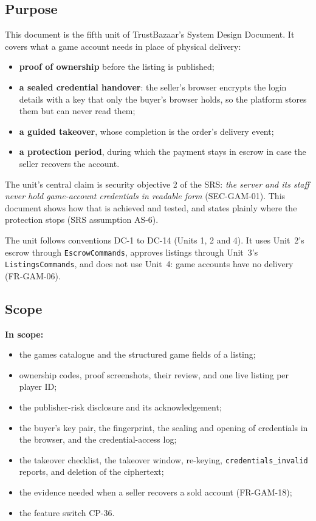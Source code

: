 \documentclass[11pt,a4paper]{article}
\begin{document}
\subsection{Purpose}
This document is the fifth unit of TrustBazaar's System Design Document. It covers what a game account needs in place of physical delivery:
\begin{itemize}[nosep]
  \item \textbf{proof of ownership} before the listing is published;
  \item \textbf{a sealed credential handover}: the seller's browser encrypts the login details with a key that only the buyer's browser holds, so the platform stores them but can never read them;
  \item \textbf{a guided takeover}, whose completion is the order's delivery event;
  \item \textbf{a protection period}, during which the payment stays in escrow in case the seller recovers the account.
\end{itemize}
The unit's central claim is security objective 2 of the SRS: \emph{the server and its staff never hold game-account credentials in readable form} (SEC-GAM-01). This document shows how that is achieved and tested, and states plainly where the protection stops (SRS assumption AS-6).

The unit follows conventions DC-1 to DC-14 (Units 1, 2 and 4). It uses Unit~2's escrow through \texttt{EscrowCommands}, approves listings through Unit~3's \texttt{ListingsCommands}, and does not use Unit~4: game accounts have no delivery (FR-GAM-06).

\subsection{Scope}
\textbf{In scope:}
\begin{itemize}[nosep]
  \item the games catalogue and the structured game fields of a listing;
  \item ownership codes, proof screenshots, their review, and one live listing per player ID;
  \item the publisher-risk disclosure and its acknowledgement;
  \item the buyer's key pair, the fingerprint, the sealing and opening of credentials in the browser, and the credential-access log;
  \item the takeover checklist, the takeover window, re-keying, \texttt{credentials\_invalid} reports, and deletion of the ciphertext;
  \item the evidence needed when a seller recovers a sold account (FR-GAM-18);
  \item the feature switch CP-36.
\end{itemize}
\end{document}
